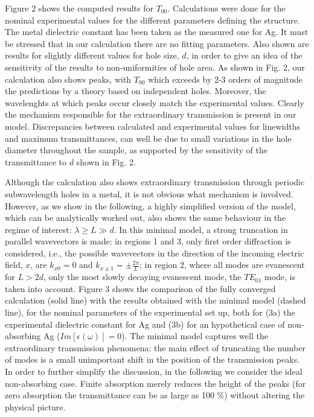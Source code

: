 Figure 2 shows the computed results for $T_{00}$.
Calculations were done for the nominal
experimental values for the different parameters defining the structure.
The metal dielectric constant has been taken as the measured
one for Ag\cite{epsilonAg}. It must be stressed that in our calculation
there are no fitting parameters. Also shown are results for slightly
different values for hole size, $d$, in order to give an idea of the
sensitivity of the results to non-uniformities of hole area. As shown in 
Fig. 2, our calculation also shows peaks,
with $T_{00}$ which exceeds by 2-3 orders of magnitude the
predictions by a theory
based on independent holes\cite{Bethe44}. Moreover, the wavelenghts at which
peaks occur closely match the experimental values. Clearly the 
mechanism responsible for the extraordinary transmission is present in our
model. Discrepancies between calculated and experimental values for
linewidths and maximum transmittances, can well be due to small variations
in the hole diameter throughout the sample, as supported by the
sensitivity of the transmittance to $d$ shown in Fig. 2.

Although the calculation also shows extraordinary transmission through
periodic subwavelength holes in a metal, it is not obvious what 
mechanism is involved. However, as we show in the following, a highly
simplified version of the model,
which can be analytically worked out,
also shows the same behaviour in the regime of interest: $
\lambda \ge L \gg d$. In this minimal model, a strong truncation in parallel
wavevectors is made: in regions 1 and 3, only first order diffraction
is considered, i.e., the possible wavevectors in the direction of the
incoming electric field, $x$, are $k_{x0}=0$ and $k_{x\pm 1} =
\pm \frac{2 \pi}{L}$; in region 2,
where all modes are evanescent for $L>2d$, only the most slowly decaying
evanescent mode, the $TE_{01}$ mode, is taken into account. Figure 3 shows the
comparison of the fully converged calculation (solid line) with the results
obtained with the minimal model (dashed line), for the nominal parameters of
the experimental set up, both for (3a) the experimental dielectric constant
for Ag and (3b) for an hypothetical case of non-absorbing Ag 
($ Im\left[\epsilon(\omega)\right]=0$). The minimal model captures 
well the extraordinary
transmission phenomena: the main effect of truncating the number of modes is
a small unimportant shift in the position of the transmission peaks.
In order to further simplify the discussion, in the following we 
consider the ideal non-absorbing case. 
Finite absorption merely reduces the height of the
peaks (for zero absorption the transmittance can be as large as 100 \%)
without altering the physical picture. 

